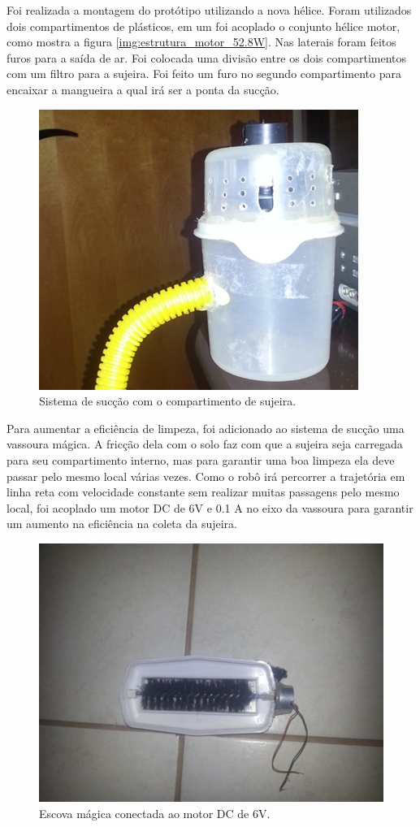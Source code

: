 		Foi realizada a montagem do protótipo utilizando a nova hélice. Foram utilizados dois compartimentos de plásticos, em um foi acoplado o conjunto hélice motor, como mostra a figura \ref{img:estrutura_motor_52.8W}. Nas laterais foram feitos furos para a saída de ar. Foi colocada uma divisão entre os dois compartimentos com um filtro para a sujeira. Foi feito um furo no segundo compartimento para encaixar a mangueira a qual irá ser a ponta da sucção.

		\begin{figure}[H]
			\centering
			\includegraphics[scale=1]{figuras/asppc2_10.jpg}
			\caption{Sistema de sucção com o compartimento de sujeira.}
			\label{img:sistema_com_compartimento}
		\end{figure}

		Para aumentar a eficiência de limpeza, foi adicionado ao sistema de sucção uma vassoura mágica. A fricção dela com o solo faz com que a sujeira seja carregada para seu compartimento interno, mas para garantir uma boa limpeza ela deve passar pelo mesmo local várias vezes. Como o robô irá percorrer a trajetória em linha reta com velocidade constante sem realizar muitas passagens pelo mesmo local, foi acoplado um motor DC de 6V e 0.1 A no eixo da vassoura para garantir um aumento na eficiência na coleta da sujeira. 

		\begin{figure}[H]
			\centering
			\includegraphics[scale=1]{figuras/asppc2_11.jpg}
			\caption{Escova mágica conectada ao motor DC de 6V.}
			\label{img:escova_com_motor}
		\end{figure}

